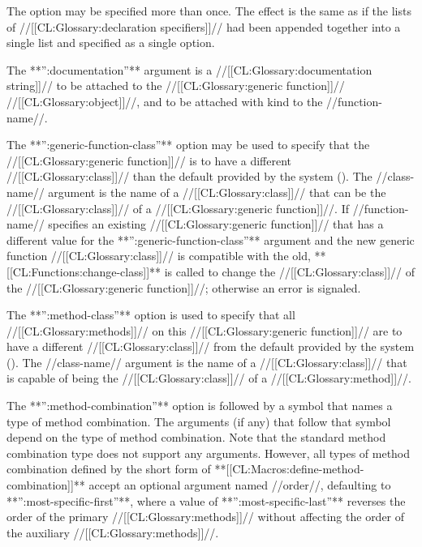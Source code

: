 The  option may be specified more than once. The effect is the same as if the lists of //[[CL:Glossary:declaration specifiers]]// had been appended together into a single list and specified as a single  option.

\itemitem{\bull} The **'':documentation''** argument is a //[[CL:Glossary:documentation string]]// to be attached to the //[[CL:Glossary:generic function]]// //[[CL:Glossary:object]]//, and to be attached with kind  to the //function-name//.

\itemitem{\bull} The **'':generic-function-class''** option may be used to specify that the //[[CL:Glossary:generic function]]// is to have a different //[[CL:Glossary:class]]// than the default provided by the system (). The //class-name// argument is the name of a //[[CL:Glossary:class]]// that can be the //[[CL:Glossary:class]]// of a //[[CL:Glossary:generic function]]//. If //function-name// specifies an existing //[[CL:Glossary:generic function]]// that has a different value for the **'':generic-function-class''** argument and the new generic function //[[CL:Glossary:class]]// is compatible with the old, **[[CL:Functions:change-class]]** is called to change the //[[CL:Glossary:class]]// of the //[[CL:Glossary:generic function]]//; otherwise an error is signaled.

\itemitem{\bull} The **'':method-class''** option is used to specify that all //[[CL:Glossary:methods]]// on this //[[CL:Glossary:generic function]]// are to have a different //[[CL:Glossary:class]]// from the default provided by the system (). The //class-name// argument is the name of a //[[CL:Glossary:class]]// that is capable of being the //[[CL:Glossary:class]]// of a //[[CL:Glossary:method]]//. 

\itemitem{\bull} The **'':method-combination''** option is followed by a symbol that names a type of method combination. The arguments (if any) that follow that symbol depend on the type of method combination. Note that the standard method combination type does not support any arguments. However, all types of method combination defined by the short form of **[[CL:Macros:define-method-combination]]** accept an optional argument named //order//, defaulting to **'':most-specific-first''**, where a value of **'':most-specific-last''** reverses the order of the primary //[[CL:Glossary:methods]]// without affecting the order of the auxiliary //[[CL:Glossary:methods]]//.

